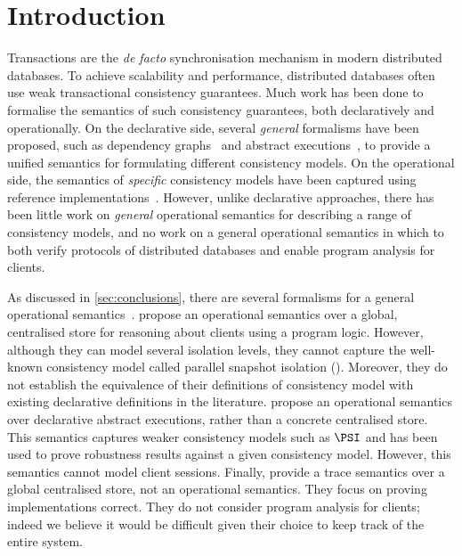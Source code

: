 \section{Introduction}
Transactions are the \emph{de facto} synchronisation mechanism in modern distributed databases.
To achieve scalability and performance, distributed databases  
often use weak transactional consistency guarantees. 
Much work has been done to formalise the semantics of such consistency guarantees, both
declaratively and operationally.
On the declarative side, several \emph{general} formalisms have been proposed, 
such as dependency graphs~\cite{adya} and abstract executions~\cite{framework-concur}, to provide a unified
semantics for formulating different consistency models.  
On the operational side, the semantics of \emph{specific} consistency models have
been captured using reference implementations~\cite{si,PSI,PSI-RA}. 
However, unlike declarative approaches, there has been
little work on \emph{general} operational semantics for describing a range
of consistency models, and no work on a general operational semantics
in which to both verify protocols of distributed databases and 
enable program analysis for clients.

As discussed in \cref{sec:conclusions}, there are several formalisms for a general operational semantics~\cite{sureshConcur,alonetogether,seebelieve}. 
\citeauthor{alonetogether} \cite{alonetogether} propose an operational
semantics over a global, centralised store  for reasoning about clients using a program logic. 
However, although they can model several isolation levels, they cannot
capture the well-known consistency model called 
parallel snapshot isolation (\PSI). 
Moreover, they do not establish the equivalence of their definitions
of consistency model
with existing declarative definitions in the literature. 
\citeauthor{sureshConcur} \cite{sureshConcur} propose an operational semantics over declarative abstract executions, rather than a concrete centralised store. This semantics captures weaker consistency models
such as \(\PSI\) and has been used to prove robustness results against
a given consistency model.  
However, this semantics cannot model client sessions.
Finally, \citeauthor{seebelieve} \cite{seebelieve} provide a trace semantics over a global
centralised store,  not an operational semantics. 
They focus on proving implementations correct. They do not consider program analysis for clients;
indeed we believe it would be difficult  given their choice to
keep track of the entire system.

